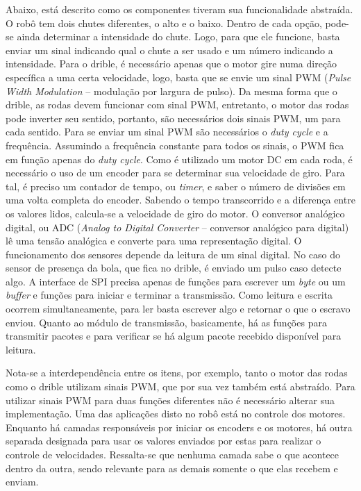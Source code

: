 Abaixo, está descrito como os componentes tiveram sua funcionalidade abstraída.
O robô tem dois chutes diferentes, o alto e o baixo. Dentro de cada opção, pode-se ainda determinar a intensidade do chute. Logo, para que ele funcione, basta enviar um sinal indicando qual o chute a ser usado e um número indicando a intensidade.
Para o drible, é necessário apenas que o motor gire numa direção específica a uma certa velocidade, logo, basta que se envie um sinal PWM (\textit{Pulse Width Modulation} – modulação por largura de pulso). Da mesma forma que o drible, as rodas devem funcionar com sinal PWM, entretanto, o motor das rodas pode inverter seu sentido, portanto, são necessários dois sinais PWM, um para cada sentido. Para se enviar um sinal PWM são necessários o \textit{duty cycle} e a frequência. Assumindo a frequência constante para todos os sinais, o PWM fica em função apenas do \textit{duty cycle}. Como é utilizado um motor DC em cada roda, é necessário o uso de um encoder para se determinar sua velocidade de giro. Para tal, é preciso um contador de tempo, ou \textit{timer}, e saber o número de divisões em uma volta completa do encoder. Sabendo o tempo transcorrido e a diferença entre os valores lidos, calcula-se a velocidade de giro do motor.
O conversor analógico digital, ou ADC (\textit{Analog to Digital Converter} – conversor analógico para digital) lê uma tensão analógica e converte para uma representação digital. O funcionamento dos sensores depende da leitura de um sinal digital. No caso do sensor de presença da bola, que fica no drible, é enviado um pulso caso detecte algo.
A interface de SPI precisa apenas de funções para escrever um \textit{byte} ou um \textit{buffer} e funções para iniciar e terminar a transmissão. Como leitura e escrita ocorrem simultaneamente, para ler basta escrever algo e retornar o que o escravo enviou.
Quanto ao módulo de transmissão, basicamente, há as funções para transmitir pacotes e para verificar se há algum pacote recebido disponível para leitura.

Nota-se a interdependência entre os itens, por exemplo, tanto o motor das rodas como o drible utilizam sinais PWM, que por sua vez também está abstraído. Para utilizar sinais PWM para duas funções diferentes não é necessário alterar sua implementação.
Uma das aplicações disto no robô está no controle dos motores. Enquanto há camadas responsáveis por iniciar os encoders e os motores, há outra separada designada para usar os valores enviados por estas para realizar o controle de velocidades. Ressalta-se que nenhuma camada sabe o que acontece dentro da outra, sendo relevante para as demais somente o que elas recebem e enviam.


